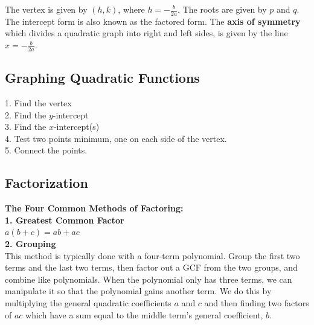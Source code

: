 \documentclass{article}
\begin{document}
    \noindent The vertex is given by $(h,k)$, where $h=-\frac{b}{2a}$. The roots are given
    by $p$ and $q$. The intercept form is also known as the factored form. The
    \textbf{axis of symmetry} which divides a quadratic graph into right and left sides,
    is given by the line $x=-\frac{b}{2a}$.

    \subsection{Graphing Quadratic Functions}

    1. Find the vertex \\
    2. Find the $y$-intercept \\
    3. Find the $x$-intercept(s) \\
    4. Test two points minimum, one on each side of the vertex. \\
    5. Connect the points.

    \begin{center}
    \end{center}

    \subsection{Factorization}

    \textbf{The Four Common Methods of Factoring:} \\
    \color{purple} \textbf{1. Greatest Common Factor} \color{black} \\
    $a(b+c)=ab+ac$ \\
    \color{purple} \textbf{2. Grouping} \color{black} \\
    This method is typically done with a four-term polynomial. Group the first two terms
    and the last two terms, then factor out a GCF from the two groups, and combine like
    polynomials. When the polynomial only has three terms, we can manipulate it so that the
    polynomial gains another term. We do this by multiplying the general quadratic
    coefficients $a$ and $c$ and then finding two factors of $ac$ which have a sum equal to
    the middle term's general coefficient, $b$. \\
\end{document}

